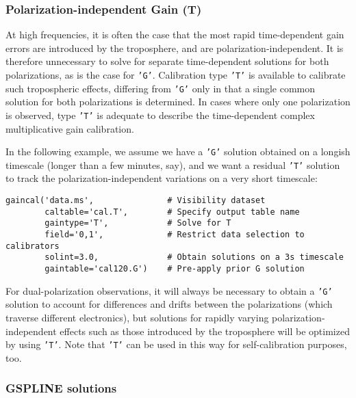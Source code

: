 \subsubsection{Polarization-independent Gain (T)}
\label{section:cal.solve.gain.t}

At high frequencies, it is often the case that the most rapid
time-dependent gain errors are introduced by the troposphere, and are
polarization-independent.  It is therefore unnecessary to solve for
separate time-dependent solutions for both polarizations, as is the
case for {\tt 'G'}.  Calibration type {\tt 'T'} is available to calibrate such
tropospheric effects, differing from {\tt 'G'} only in that a single common
solution for both polarizations is determined.  In cases where only
one polarization is observed, type {\tt 'T'} is adequate to describe the
time-dependent complex multiplicative gain calibration.

In the following example, we assume we have a {\tt 'G'} solution obtained on
a longish timescale (longer than a few minutes, say), and we want a residual
{\tt 'T'} solution to track the polarization-independent variations on a
very short timescale:

\small
\begin{verbatim}
gaincal('data.ms',               # Visibility dataset
        caltable='cal.T',        # Specify output table name
        gaintype='T',            # Solve for T
        field='0,1',             # Restrict data selection to calibrators
        solint=3.0,              # Obtain solutions on a 3s timescale
        gaintable='cal120.G')    # Pre-apply prior G solution
\end{verbatim}
\normalsize

For dual-polarization observations, it will always be necessary to
obtain a {\tt 'G'} solution to account for differences and drifts between
the polarizations (which traverse different electronics), but
solutions for rapidly varying polarization-independent effects such as
those introduced by the troposphere will be optimized by using {\tt 'T'}.
Note that {\tt 'T'} can be used in this way for self-calibration purposes,
too.

\subsubsection{GSPLINE solutions}
\label{section:cal.solve.gain.gspline}


